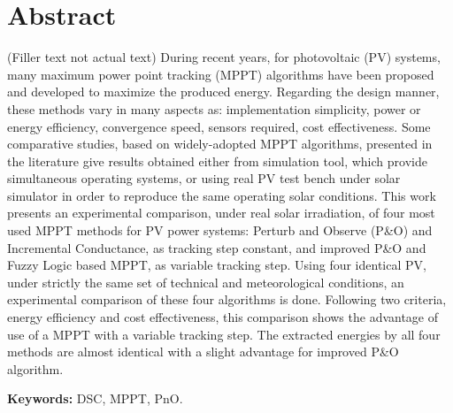 \chapter*{Abstract}
\thispagestyle{begin}

(Filler text not actual text) During recent years, for photovoltaic (PV) systems, many maximum power point tracking (MPPT) algorithms have been proposed and developed to maximize the produced energy. Regarding the design manner, these methods vary in many aspects as: implementation simplicity, power or energy efficiency, convergence speed, sensors required, cost effectiveness. Some comparative studies, based on widely-adopted MPPT algorithms, presented in the literature give results obtained either from simulation tool, which provide simultaneous operating systems, or using real PV test bench under solar simulator in order to reproduce the same operating solar conditions. This work presents an experimental comparison, under real solar irradiation, of four most used MPPT methods for PV power systems: Perturb and Observe (P\&O) and Incremental Conductance, as tracking step constant, and improved P\&O and Fuzzy Logic based MPPT, as variable tracking step. Using four identical PV, under strictly the same set of technical and meteorological conditions, an experimental comparison of these four algorithms is done. Following two criteria, energy efficiency and cost effectiveness, this comparison shows the advantage of use of a MPPT with a variable tracking step. The extracted energies by all four methods are almost identical with a slight advantage for improved P\&O algorithm. \newline

{\bf Keywords:} DSC, MPPT, PnO.
\acresetall
